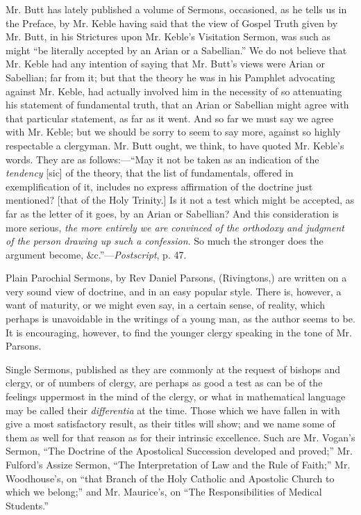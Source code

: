 Mr. Butt has lately published a volume of Sermons,
occasioned, as he tells us in the Preface, by Mr. Keble having said that
the view of Gospel Truth given by Mr. Butt, in his Strictures upon Mr.
Keble's Visitation Sermon, was such as might ``be literally accepted by
an Arian or a Sabellian.'' We do not believe that Mr. Keble had any
intention of saying that Mr. Butt's views were Arian or Sabellian; far
from it; but that the theory he was in his Pamphlet advocating against
Mr. Keble, had actually involved him in the necessity of so attenuating
his statement of fundamental truth, that an Arian or Sabellian might
agree with that particular statement, as far as it went. And so far we
must say we agree with Mr. Keble; but we should be sorry to seem to say
more, against so highly respectable a clergyman. Mr. Butt ought, we
think, to have quoted Mr. Keble's words. They are as follows:—``May it
not be taken as an indication of the \emph{tendency} [sic] of the
theory, that the list of fundamentals, offered in exemplification of it,
includes no express affirmation of the doctrine just mentioned? [that of
the Holy Trinity.] Is it not a test which might be accepted, as
far as the letter of it goes, by an Arian or Sabellian? And this
consideration is more serious, \emph{the more entirely we are convinced of
the orthodoxy and judgment of the person drawing up such a confession}.
So much the stronger does the argument become, \&c.''—\emph{Postscript},
p. 47.

Plain Parochial Sermons, by Rev Daniel Parsons,
(Rivingtons,) are written on a very sound view of doctrine, and in an
easy popular style. There is, however, a want of maturity, or we might
even say, in a certain sense, of reality, which perhaps is unavoidable
in the writings of a young man, as the author seems to be. It is
encouraging, however, to find the younger clergy speaking in the tone of
Mr. Parsons.

Single Sermons, published as they are commonly at
the request of bishops and clergy, or of numbers of clergy, are perhaps
as good a test as can be of the feelings uppermost in the mind of the
clergy, or what in mathematical language may be called their \emph{differentia}
at the time. Those which we have fallen in with give a most satisfactory
result, as their titles will show; and we name some of them as well for
that reason as for their intrinsic excellence. Such are Mr. Vogan's
Sermon, ``The Doctrine of the Apostolical Succession developed and
proved;'' Mr. Fulford's Assize Sermon, ``The Interpretation of Law and the
Rule of Faith;'' Mr. Woodhouse's, on ``that Branch of the Holy Catholic
and Apostolic Church to which we belong;'' and Mr. Maurice's, on ``The
Responsibilities of Medical Students.''


